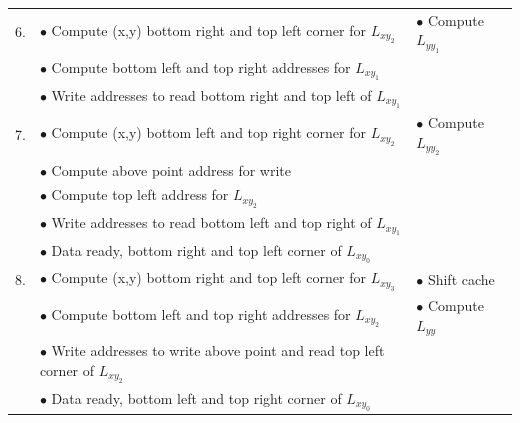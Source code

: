 \documentclass{article}
\begin{document}
\begin{table}[h]
\begin{tabulary}{1.0\textwidth}{L|L|L}
		6. & $\bullet$ Compute (x,y) bottom right and top left corner for $L_{xy_2}$ & $\bullet$ Compute $L_{yy_1}$ \\
		& $\bullet$ Compute bottom left and top right addresses for $L_{xy_1}$ & \\
		& $\bullet$ Write addresses to read bottom right and top left of $L_{xy_1}$ & \\
		\hline 
		
		7. & $\bullet$ Compute (x,y) bottom left and top right corner for $L_{xy_2}$ & $\bullet$ Compute $L_{yy_2}$ \\
		& $\bullet$ Compute above point address for write & \\
		& $\bullet$ Compute top left address for $L_{xy_2}$ & \\
		& $\bullet$ Write addresses to read bottom left and top right of $L_{xy_1}$ & \\
		& $\bullet$ Data ready, bottom right and top left corner of $L_{xy_0}$ & \\
		\hline
		
		8. & $\bullet$ Compute (x,y) bottom right and top left corner for $L_{xy_3}$ & $\bullet$ Shift cache \\
		& $\bullet$ Compute bottom left and top right addresses for $L_{xy_2}$ & $\bullet$ Compute $L_{yy}$ \\
		& $\bullet$ Write addresses to write above point and read top left corner of $L_{xy_2}$ & \\
		& $\bullet$ Data ready, bottom left and top right corner of $L_{xy_0}$ & \\
		\hline
	\end{tabulary}
\end{table}
\end{document}
